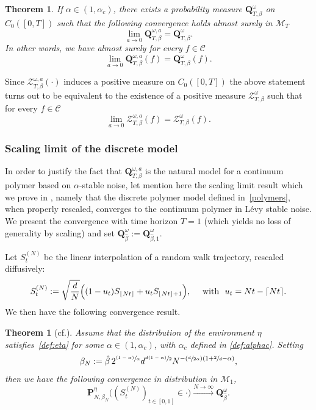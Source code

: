 \documentclass[11pt]{article}
\newcommand{\cf}{cf.\xspace}
\numberwithin{equation}{section}
\let\mathcal\mathscr
\newcommand{\Psfrac}[2]{(\sfrac{#1}{#2})}
\newcommand{\psfrac}[2]{\sfrac{(#1)}{#2}}
\newtheorem{theorema}{Theorem}
\newtheorem{theorem}{Theorem}[section]
\theoremstyle{definition}
\newcommand{\cC}{{\ensuremath{\mathcal C}} }
\newcommand{\cM}{{\ensuremath{\mathcal M}} }
\newcommand{\cZ}{{\ensuremath{\mathcal Z}} }
\newcommand{\bP}{{\ensuremath{\mathbf P}} }
\newcommand{\bQ}{{\ensuremath{\mathbf Q}} }
\let\ga\alpha
\let\go\omega
\begin{document}
\begin{theorem}\label{thm:contmeasure}
If $\ga\in (1,\ga_c)$, there exists a probability measure
$\bQ^{\go}_{T,\beta}$ on $C_0([0,T])$ such that
the following convergence holds almost surely in $\cM_T$
\[
\lim_{a\to 0} \bQ^{\go,a}_{T,\beta}= \bQ^{\go}_{T,\beta}.
\]
In other words, we have almost surely for every $f\in \cC$
\begin{equation}
\lim_{a\to 0} \bQ^{\go,a}_{T,\beta}(f)= \bQ^{\go}_{T,\beta}(f).
\end{equation}
\end{theorem}
Since
$\cZ^{\go,a }_{T, \beta}(\cdot)$ induces a positive measure on $C_0([0,T])$ the above statement turns out to be equivalent to the existence of a positive measure $\cZ^{\go}_{T, \beta}$ such that for every $f\in \cC$
\begin{equation}
\lim_{a \to 0}\cZ^{\go,a }_{T, \beta}(f)=\cZ^{\go}_{T, \beta}(f).
\end{equation}

\subsubsection{Scaling limit of the discrete model}

In order to justify the fact that $\bQ^{\go,a}_{T,\beta}$ is the natural model for a continuum polymer based on $\alpha$-stable noise, let mention here the scaling limit result which we prove in \cite{BL20_disc},
namely that the discrete polymer model defined in~\eqref{polymers},
when properly rescaled, converges to the continuum
polymer in Lévy stable noise.
We present the convergence with time horizon $T=1$ (which yields no loss of generality by scaling) and set $\bQ^{\go }_{ \hat \beta}:= \bQ^{\go }_{ \hat \beta,1}$.

Let $S_t^{(N)}$ be the linear interpolation
of a random walk trajectory, rescaled diffusively:\vspace*{-3pt}\enlargethispage{\baselineskip}%
\begin{equation}\label{defsn}
S^{(N)}_t:= \sqrt{\frac{d}{N}} \Bigl((1-u_t) S_{\lfloor Nt \rfloor} +u_t S_{\lfloor Nt \rfloor+1} \Bigr),
\quad \text{ with } \ u_t= Nt-\lceil N t \rceil.
\end{equation}
We then have the following convergence result.

\begin{theorema}[\cf \cite{BL20_disc}]
\label{thm:conv}
Assume that the distribution of the environment $\eta$ satisfies~\eqref{def:eta} for some $\alpha\in (1,\alpha_c)$, with $\alpha_c$ defined in \eqref{def:alphac}.
Setting
\begin{equation}\label{scalechoice}
\beta_N:= \hat \beta\, 2^{\psfrac{1-\ga}{\alpha}} d^{\sfrac{d(1-\alpha)}{2}} N^{- \Psfrac{d}{2\ga} (1+ \sfrac{2}{d}-\alpha) },
\end{equation}
then we have the following convergence in distribution in $\cM_1$,
\begin{equation}
\bP^{\eta}_{N,\beta_N}\bigl((S^{(N)}_t)_{t\in [0,1]} \in \cdot \bigr) \stackrel{N\to \infty}\to \bQ^{\go }_{ \hat \beta}.
\end{equation}
\end{theorema}
\end{document}
